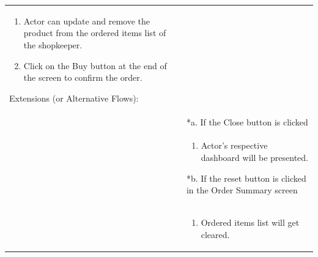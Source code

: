 \documentclass[12pt,a4paper]{report}
\begin{document}
\begin{tabular}{ | m{3cm} | m{12cm}| }
\begin{enumerate}
\item Actor can update and remove the product from the ordered items list of the shopkeeper.

\item Click on the Buy button at the end of the screen to confirm the order.

\end{enumerate}

Extensions (or Alternative Flows):\\

& *a. If the Close button is clicked \\

& \begin{enumerate}

		\item Actor's respective dashboard will be presented.

	\end{enumerate}

*b. If the reset button is clicked in the Order Summary screen\\

& \begin{enumerate}

		\item Ordered items list will get cleared.

	\end{enumerate}
	\\ \hline
\end{tabular}
\end{document}
